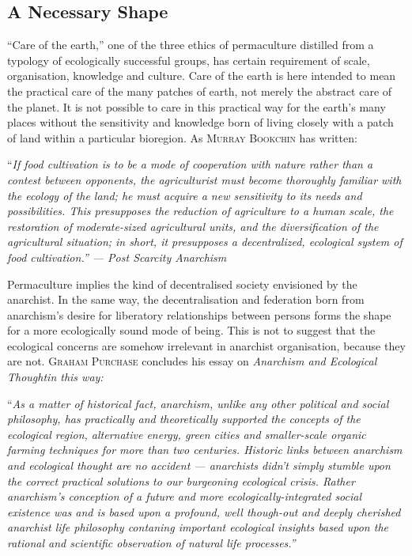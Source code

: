 \documentclass[a4paper, 11pt]{article}
\begin{document}
\begin{multicols*}{2}
\section*{A Necessary Shape}

``Care of the earth,'' one of the three ethics of permaculture distilled from a typology of ecologically successful groups, has certain requirement of scale, organisation, knowledge and culture.  Care of the earth is here intended to mean the practical care of the many patches of earth, not merely the abstract care of the planet.  It is not possible to care in this practical way for the earth's many places without the sensitivity and knowledge born of living closely with a patch of land within a particular bioregion.  As \textsc{Murray Bookchin} has written:

\vspace{1mm}
``\em{If food cultivation is to be a mode of cooperation with nature rather than a contest between opponents, the agriculturist must become thoroughly familiar with the ecology of the land; he must acquire a new sensitivity to its needs and possibilities. This presupposes the reduction of agriculture to a human scale, the restoration of moderate-sized agricultural units, and the diversification of the agricultural situation; in short, it presupposes a decentralized, ecological system of food cultivation.}\em'' --- \em{Post Scarcity Anarchism}\em
\vspace{1mm}

Permaculture implies the kind of decentralised society envisioned by the anarchist.  In the same way, the decentralisation and federation born from anarchism's desire for liberatory relationships between persons forms the shape for a more ecologically sound mode of being.  This is not to suggest that the ecological concerns are somehow irrelevant in anarchist organisation, because they are not.  \textsc{Graham Purchase} concludes his essay on \em{Anarchism and Ecological Thought}\em in this way:

\vspace{1mm}
``\em{As a matter of historical fact, anarchism, unlike any other political and social philosophy, has practically and theoretically supported the concepts of the ecological region, alternative energy, green cities and smaller-scale organic farming techniques for more than two centuries.  Historic links between anarchism and ecological thought are no accident --- anarchists didn't simply stumble upon the correct practical solutions to our burgeoning ecological crisis.  Rather anarchism's conception of a future and more ecologically-integrated social existence was and is based upon a profound, well though-out and deeply cherished anarchist life philosophy contaning important ecological insights based upon the rational and scientific observation of natural life processes.}\em'' 
\vspace{1mm}


\end{multicols*}
\end{document}
